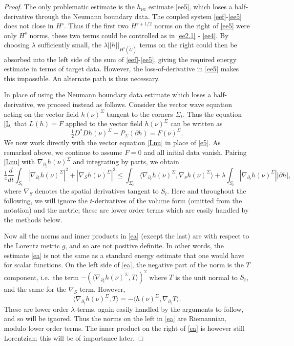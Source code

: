 \documentclass[10pt]{amsart}
\newcommand{\Si}{\Sigma}
\renewcommand{\l}{\lambda}
\newcommand{\be}{\begin{equation}}
\newcommand{\ee}{\end{equation}}
\newcommand{\p}{\partial}
\newcommand{\<}{\langle}
\renewcommand{\>}{\rangle}
\newcommand{\w}{\widetilde}
\theoremstyle{plain}
\theoremstyle{remark}
\theoremstyle{definition}
\numberwithin{equation}{section}
\begin{document}
\begin{proof}
 The only problematic estimate is the $h_{\nu a}$ estimate \eqref{ee5}, which loses a half-derivative through the Neumann boundary data. The coupled 
system \eqref{eef}-\eqref{ee5} does not close in $H^s$. Thus if the first two $H^{s+1/2}$ norms on the right of \eqref{ee5} were only $H^s$ norms, these 
two terms could be controlled as in \eqref{ee2.1} - \eqref{ee4}. By choosing $\l$ sufficiently small, the $\l ||h||_{H^s(\w U)}$ terms on the right could then 
be absorbed into the left side of the sum of \eqref{eef}-\eqref{ee5}, giving the required energy estimate in terms of target data. However, the 
loss-of-derivative  in \eqref{ee5} makes this impossible. An alternate path is thus necessary. 
 
  
  \medskip 
 
   In place of using the Neumann boundary data estimate which loses a half-derivative, we proceed instead as follows. 
Consider the vector wave equation acting on the vector field $h(\nu)^{\Si}$ tangent to the corners $\Si_t$. Thus the equation \eqref{L} that $L(h) = F$ 
applied to the vector field $h(\nu)^{\Si}$ can be written as  
\be \label{Lnu}
\tfrac{1}{2}D^*D h(\nu)^{\Si} + P_{\Si}(\p h) = F(\nu)^{\Si}.
\ee
We now work directly with the vector equation \eqref{Lnu} in place of \eqref{e5}. As remarked above, we continue to assume $F = 0$ and 
all initial data vanish. Pairing \eqref{Lnu} with $\nabla_{\p_t} h(\nu)^{\Si}$ and integrating by parts, we obtain  
\be \label{ea}
\tfrac{1}{4}\frac{d}{dt}\int_{S_t}|\nabla_{\p_t} h(\nu)^{\Si}|^2 + |\nabla_S h(\nu)^{\Si}|^2 \leq \int_{\Si_t}\<\nabla_{\p_t} h(\nu)^{\Si}, \nabla_{\nu}h(\nu)^{\Si}\> + 
\l \int_{S_t}|\nabla_{\p_t}h(\nu)^{\Si}||\p h|,
\ee
where $\nabla_S$ denotes the spatial derivatives tangent to $S_t$. Here and throughout the following, we will ignore the $t$-derivatives of the volume 
form (omitted from the notation) and the metric; these are lower order terms which are easily handled by the methods below. 

  Now all the norms and inner products in \eqref{ea} (except the last) are with respect to the Lorentz metric $g$, and so are not positive definite. In other words, 
the estimate \eqref{ea} is not the same as a standard energy estimate that one would have for scalar functions. On the left side of \eqref{ea}, the 
negative part of the norm is the $T$ component, i.e.~the term $-(\<\nabla_{\p_t} h(\nu)^{\Si}, T\>)^2$ where $T$ is the unit normal to $S_t$, 
and the same for the $\nabla_S$ term. However, 
$$\<\nabla_{\p_t} h(\nu)^{\Si}, T\>  = -\<h(\nu)^{\Si}, \nabla_{\p_t} T\>.$$
These are lower order $\l$-terms, again easily handled by the arguments to follow, and so will be ignored. Thus the norms on the left in \eqref{ea} are 
Riemannian, modulo lower order terms. The inner product on the right of \eqref{ea} is however still Lorentzian; this will be of importance later. 


\end{proof}
\end{document}
